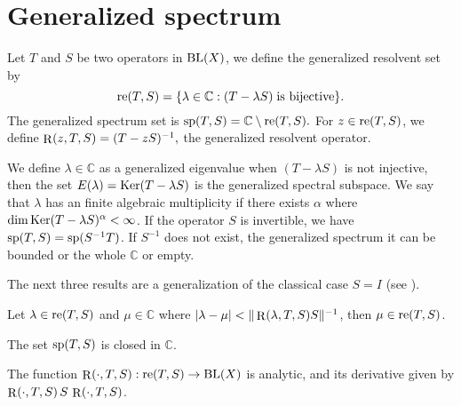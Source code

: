 \documentclass[
11pt,%
tightenlines,%
twoside,%
onecolumn,%
nofloats,%
nobibnotes,%
nofootinbib,%
superscriptaddress,%
noshowpacs,%
centertags]%
{revtex4}
\def\Ker{\mathop{\rm Ker}\nolimits}
\def\re{\mathop{\rm re}\nolimits}
\def\R{\mathop{\rm R}\nolimits}
\def\BL{\mathop{\rm BL}\nolimits}
\def\sp{\mathop{\rm sp}\nolimits}
\def\re{\mathop{\rm re}\nolimits}
\def\dim{\mathop{\rm dim}\nolimits}
\begin{document}
\section{Generalized spectrum}

Let $T$ and $S$ be two operators in $\BL(X)$, we define the
generalized resolvent set by
\begin{equation*}
    \re(T,S)=\{\lambda\in\mathbb{C}:(T-\lambda S) \;\mbox{is bijective}\}.
\end{equation*}
The generalized spectrum set is
$
    \sp(T,S)=\mathbb{C}\setminus \mbox{re}(T,S).
$
For $z\in \re(T,S)$, we define
$
    \R(z,T,S)=(T-zS)^{-1},
$ the generalized resolvent operator.

 We define
$\lambda\in\mathbb{C}$ as a generalized eigenvalue when $(T-\lambda
S)$ is not injective, then the set $E(\lambda)=\Ker(T-\lambda S)$ is
the generalized spectral subspace. We say that $\lambda$ has an
finite algebraic multiplicity if there exists $\alpha$ where
$\dim\Ker(T-\lambda S)^{\alpha}<\infty$. If the operator $S$ is
invertible, we have $\sp(T,S)=\sp(S^{-1}T)$. If $S^{-1}$ does not
exist, the generalized spectrum it can be bounded or the whole
$\mathbb{C}$ or empty.\par \indent The next three results are a
generalization of the classical case $S=I$ (see \cite{bib16}).
\begin{theorem}Let $\lambda\in\re(T,S)$ and
 $\mu\in\mathbb{C}$ where \hbox{$|\lambda-\mu|<\|\R(\lambda,T,S)S\|^{-1}$}, then $\mu\in \re(T,S)$.
\end{theorem}
\begin{corollary}\label{coro1}
The set $\sp(T,S)$ is closed in $\mathbb{C}$.
\end{corollary}
\begin{theorem}\label{th2}
The function $\R(\cdot,T,S):\re(T,S)\rightarrow\BL(X)$ is  analytic,
and its derivative given by
$\displaystyle{\R(\cdot,T,S)\,S\,\R(\cdot,T,S)}$.
\end{theorem}
\end{document}
